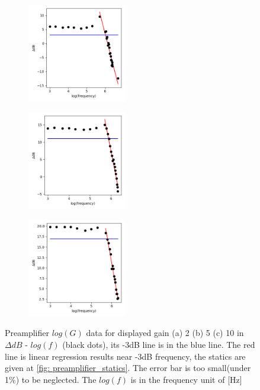 \documentclass{article}
\begin{document}
\begin{figure}[H]
    \begin{subfigure}[b]{4.3cm}
        \centering
        \includegraphics[width=4.3cm]{../results/preamplifier_log_plot(gain2.0).png}
        \caption{}
    \end{subfigure}
    \hfill
    \begin{subfigure}[b]{4.3cm}
      \centering
      \includegraphics[width=4.3cm]{../results/preamplifier_log_plot(gain5.0).png}
      \caption{}
  \end{subfigure}
  \hfill
  \begin{subfigure}[b]{4.3cm}
    \centering
    \includegraphics[width=4.3cm]{../results/preamplifier_log_plot(gain10.0).png}
    \caption{}
  \end{subfigure}
  \hfill
    \caption{Preamplifier $log(G)$ data for displayed gain (a) 2 (b) 5 (c) 10 in $\Delta dB$ - $log(f)$ (black dots),
     its -3dB line is in the blue line.
     The red line is linear regression results near -3dB frequency, the statics are given at \ref{fig: preamplifier_statics}.
     The error bar is too small(under 1\%) to be neglected.
     The $log(f)$ is in the frequency unit of [Hz]
     }
    \label{fig: preamplifier_loglog_plot}
  \end{figure}
\end{document}
